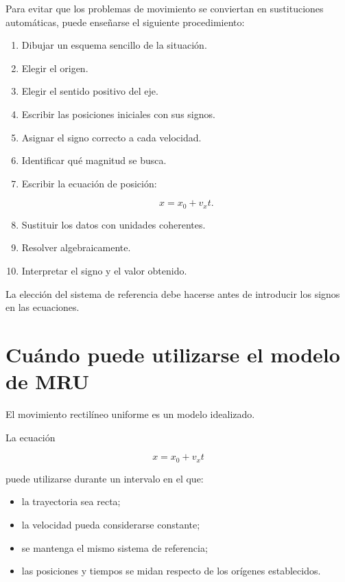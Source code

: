\begin{notapedagogica}
Para evitar que los problemas de movimiento se conviertan en sustituciones
automáticas, puede enseñarse el siguiente procedimiento:

\begin{enumerate}

    \item Dibujar un esquema sencillo de la situación.

    \item Elegir el origen.

    \item Elegir el sentido positivo del eje.

    \item Escribir las posiciones iniciales con sus signos.

    \item Asignar el signo correcto a cada velocidad.

    \item Identificar qué magnitud se busca.

    \item Escribir la ecuación de posición:

    \[
    x=x_0+v_xt.
    \]

    \item Sustituir los datos con unidades coherentes.

    \item Resolver algebraicamente.

    \item Interpretar el signo y el valor obtenido.

\end{enumerate}

La elección del sistema de referencia debe hacerse antes de introducir los
signos en las ecuaciones.
\end{notapedagogica}


\section{Cuándo puede utilizarse el modelo de MRU}

El movimiento rectilíneo uniforme es un modelo idealizado.

\begin{condicion}
La ecuación

\[ x=x_0+v_xt \]

puede utilizarse durante un intervalo en el que:

\begin{itemize}
    \item la trayectoria sea recta;
    \item la velocidad pueda considerarse constante;
    \item se mantenga el mismo sistema de referencia;
    \item las posiciones y tiempos se midan respecto de los orígenes
    establecidos.
\end{itemize}
\end{condicion}

